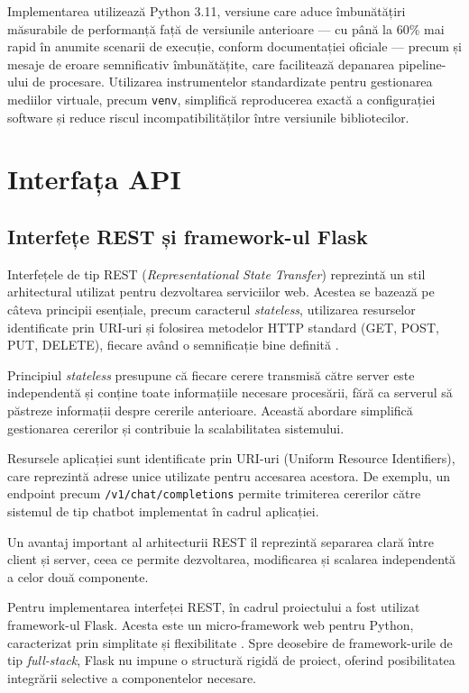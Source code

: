 \documentclass[12pt, a4paper, oneside, romanian]{teza-upb}
\begin{document}
Implementarea utilizează Python 3.11, versiune care aduce îmbunătățiri măsurabile
de performanță față de versiunile anterioare — cu până la 60\% mai rapid în anumite
scenarii de execuție, conform documentației oficiale \cite{python311} — precum și
mesaje de eroare semnificativ îmbunătățite, care facilitează depanarea pipeline-ului
de procesare. Utilizarea instrumentelor standardizate pentru gestionarea mediilor
virtuale, precum \texttt{venv}, simplifică reproducerea exactă
a configurației software și reduce riscul incompatibilităților între versiunile
bibliotecilor.



\section{Interfața API}

\subsection{Interfețe REST și framework-ul Flask}

Interfețele de tip REST (\textit{Representational State Transfer}) reprezintă un stil arhitectural utilizat pentru dezvoltarea serviciilor web. Acestea se bazează pe câteva principii esențiale, precum caracterul \textit{stateless}, utilizarea resurselor identificate prin URI-uri și folosirea metodelor HTTP standard (GET, POST, PUT, DELETE), fiecare având o semnificație bine definită \cite{fielding2000rest}.

Principiul \textit{stateless} presupune că fiecare cerere transmisă către server este independentă și conține toate informațiile necesare procesării, fără ca serverul să păstreze informații despre cererile anterioare. Această abordare simplifică gestionarea cererilor și contribuie la scalabilitatea sistemului.

Resursele aplicației sunt identificate prin URI-uri (Uniform Resource Identifiers), care reprezintă adrese unice utilizate pentru accesarea acestora. De exemplu, un endpoint precum \texttt{/v1/chat/completions} permite trimiterea cererilor către sistemul de tip chatbot implementat în cadrul aplicației.

Un avantaj important al arhitecturii REST îl reprezintă separarea clară între client și server, ceea ce permite dezvoltarea, modificarea și scalarea independentă a celor două componente.

Pentru implementarea interfeței REST, în cadrul proiectului a fost utilizat framework-ul Flask. Acesta este un micro-framework web pentru Python, caracterizat prin simplitate și flexibilitate \cite{flask_doc}. Spre deosebire de framework-urile de tip \textit{full-stack}, Flask nu impune o structură rigidă de proiect, oferind posibilitatea integrării selective a componentelor necesare.
\end{document}
